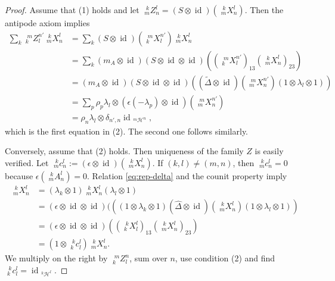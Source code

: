 \documentclass[12pt]{article}
\theoremstyle{change}
\DeclareMathOperator{\id}{id}
\newcommand{\Gr}[5]{\;{}^{\;#2}_{#4}#1_{#5}^{#3}}%
\newcommand{\Gru}[3]{\;{}^{\;#2}#1^{#3}}
\theoremstyle{definition}
\numberwithin{equation}{section}
\begin{document}
\begin{proof}
   Assume that (1) holds and let  $\Gr{Z}{k}{l}{m}{n}=(S \otimes
   \id)(\Gr{X}{k}{l}{m}{n})$. Then the antipode axiom implies
   \begin{align*}
     \sum_{k} \Gr{Z}{m}{n'}{k}{l} \Gr{X}{k}{l}{m}{n} &= \sum_{k}
     (S\otimes \id)(\Gr{X}{m}{n'}{k}{l}) \Gr{X}{k}{l}{m}{n}
     \\
     &=\sum_{k} (m_{A} \otimes \id)(S\otimes \id \otimes \id) (
     (\Gr{X}{m}{n
       '}{k}{l})_{13}(\Gr{X}{k}{l}{m}{n})_{23}) \\
     &= (m_{A} \otimes \id)(S\otimes \id \otimes \id)((\tilde \Delta
     \otimes \id)(\Gr{X}{m}{n'}{m}{n})(1 \otimes \lambda_{l}\otimes
     1)) \\
     &= \sum_{p} \rho_{p}\lambda_{l} \otimes (\epsilon(-\lambda_{p}
    ) \otimes \id)(\Gr{X}{m}{n'}{m}{n}) \\
     &= \rho_{n}\lambda_{l} \otimes \delta_{n',n}
     \id_{\Gru{\mathcal{H}}{m}{n}},
   \end{align*}
   which is the first equation in (2). The second one follows
   similarly.

   Conversely, assume that (2) holds. Then uniqueness of the family
   $Z$ is easily verified. Let $\Gr{c}{k}{l}{m}{n}:=(\epsilon \otimes
   \id)(\Gr{X}{k}{l}{m}{n})$.  If $(k,l)\neq (m,n)$, then
   $\Gr{c}{k}{l}{m}{n} = 0$ because
   $\epsilon(\Gr{A}{k}{l}{m}{n})=0$. Relation \eqref{eq:rep-delta} and
   the counit property imply
\begin{align*}
  \Gr{X}{k}{l}{m}{n} &=
  (\lambda_{k} \otimes 1)\Gr{X}{k}{l}{m}{n}(\lambda_{l}\otimes 1) \\
  &= (\epsilon \otimes \id \otimes \id)(((1 \otimes \lambda_{k} \otimes
  1)(\hat \Delta \otimes \id)(\Gr{X}{k}{l}{m}{n})(1 \otimes \lambda_{l}
  \otimes 1)) \\ &=(\epsilon \otimes \id \otimes \id)
  \left(\left(\Gr{X}{k}{l}{k}{l}\right)_{13}\left(\Gr{X}{k}{l}{m}{n}\right)_{23}\right)
\\ &  = (1 \otimes \Gr{c}{k}{l}{k}{l}) \Gr{X}{k}{l}{m}{n}.
   \end{align*}
   We multiply on the right by $\Gr{Z}{m}{n}{k}{l}$, sum over $n$, use
   condition (2) and find
   $\Gr{c}{k}{l}{k}{l}=\id_{\Gru{\mathcal{H}}{k}{l}}$.
\end{proof}
\end{document}
